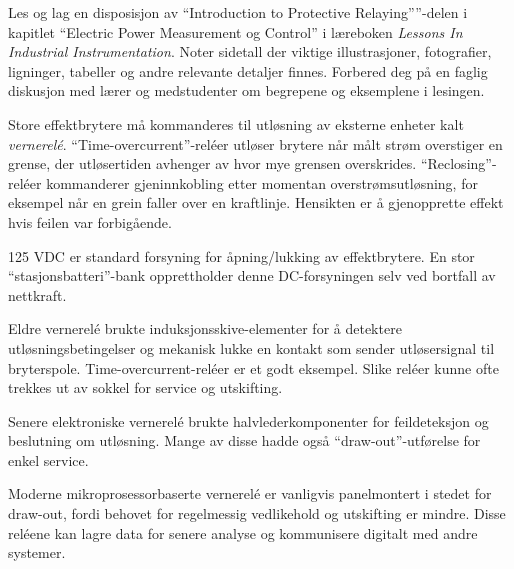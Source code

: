 

Les og lag en disposisjon av ``Introduction to Protective Relaying''''-delen i kapitlet ``Electric Power Measurement og Control'' i læreboken {\it Lessons In Industrial Instrumentation}. Noter sidetall der viktige illustrasjoner, fotografier, ligninger, tabeller og andre relevante detaljer finnes. Forbered deg på en faglig diskusjon med lærer og medstudenter om begrepene og eksemplene i lesingen.













Store effektbrytere må kommanderes til utløsning av eksterne enheter kalt {\it vernerelé}. ``Time-overcurrent''-reléer utløser brytere når målt strøm overstiger en grense, der utløsertiden avhenger av hvor mye grensen overskrides. ``Reclosing''-reléer kommanderer gjeninnkobling etter momentan overstrømsutløsning, for eksempel når en grein faller over en kraftlinje. Hensikten er å gjenopprette effekt hvis feilen var forbigående.

\vskip 10pt

125 VDC er standard forsyning for åpning/lukking av effektbrytere. En stor ``stasjonsbatteri''-bank opprettholder denne DC-forsyningen selv ved bortfall av nettkraft.

\vskip 10pt

Eldre vernerelé brukte induksjonsskive-elementer for å detektere utløsningsbetingelser og mekanisk lukke en kontakt som sender utløsersignal til bryterspole. Time-overcurrent-reléer er et godt eksempel. Slike reléer kunne ofte trekkes ut av sokkel for service og utskifting.

Senere elektroniske vernerelé brukte halvlederkomponenter for feildeteksjon og beslutning om utløsning. Mange av disse hadde også ``draw-out''-utførelse for enkel service.

Moderne mikroprosessorbaserte vernerelé er vanligvis panelmontert i stedet for draw-out, fordi behovet for regelmessig vedlikehold og utskifting er mindre. Disse reléene kan lagre data for senere analyse og kommunisere digitalt med andre systemer.

